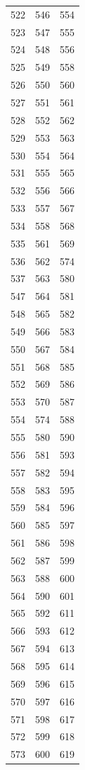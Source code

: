\begin{tabular}{rrr}
  522 & 546 & 554 \\
  523 & 547 & 555 \\
  524 & 548 & 556 \\
  525 & 549 & 558 \\
  526 & 550 & 560 \\
  527 & 551 & 561 \\
  528 & 552 & 562 \\
  529 & 553 & 563 \\
  530 & 554 & 564 \\
  531 & 555 & 565 \\
  532 & 556 & 566 \\
  533 & 557 & 567 \\
  534 & 558 & 568 \\
  535 & 561 & 569 \\
  536 & 562 & 574 \\
  537 & 563 & 580 \\
  547 & 564 & 581 \\
  548 & 565 & 582 \\
  549 & 566 & 583 \\
  550 & 567 & 584 \\
  551 & 568 & 585 \\
  552 & 569 & 586 \\
  553 & 570 & 587 \\
  554 & 574 & 588 \\
  555 & 580 & 590 \\
  556 & 581 & 593 \\
  557 & 582 & 594 \\
  558 & 583 & 595 \\
  559 & 584 & 596 \\
  560 & 585 & 597 \\
  561 & 586 & 598 \\
  562 & 587 & 599 \\
  563 & 588 & 600 \\
  564 & 590 & 601 \\
  565 & 592 & 611 \\
  566 & 593 & 612 \\
  567 & 594 & 613 \\
  568 & 595 & 614 \\
  569 & 596 & 615 \\
  570 & 597 & 616 \\
  571 & 598 & 617 \\
  572 & 599 & 618 \\
  573 & 600 & 619 \\

\end{tabular}
